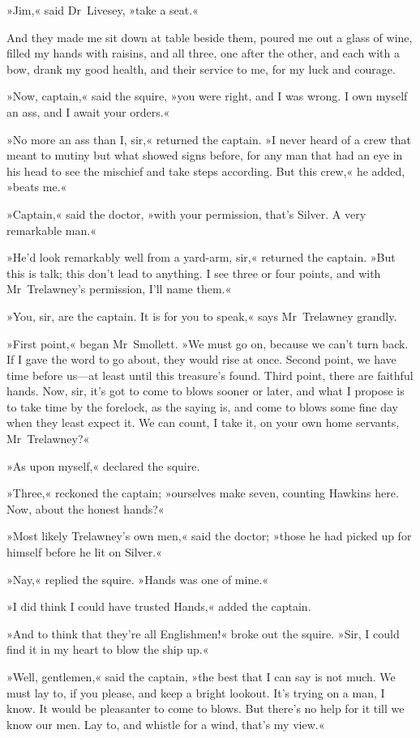 »Jim,« said Dr~Livesey, »take a seat.«

And they made me sit down at table beside them, poured me out a glass of wine, filled my hands with raisins, and all three, one after the other, and each with a bow, drank my good health, and their service to me, for my luck and courage.

»Now, captain,« said the squire, »you were right, and I was wrong. I own myself an ass, and I await your orders.«

»No more an ass than I, sir,« returned the captain. »I never heard of a crew that meant to mutiny but what showed signs before, for any man that had an eye in his head to see the mischief and take steps according. But this crew,« he added, »beats me.«

»Captain,« said the doctor, »with your permission, that's Silver. A very remarkable man.«

»He'd look remarkably well from a yard-arm, sir,« returned the captain. »But this is talk; this don't lead to anything. I see three or four points, and with Mr~Trelawney's permission, I'll name them.«

»You, sir, are the captain. It is for you to speak,« says Mr~Trelawney grandly.

»First point,« began Mr~Smollett. »We must go on, because we can't turn back. If I gave the word to go about, they would rise at once. Second point, we have time before us—at least until this treasure's found. Third point, there are faithful hands. Now, sir, it's got to come to blows sooner or later, and what I propose is to take time by the forelock, as the saying is, and come to blows some fine day when they least expect it. We can count, I take it, on your own home servants, Mr~Trelawney?«

»As upon myself,« declared the squire.

»Three,« reckoned the captain; »ourselves make seven, counting Hawkins here. Now, about the honest hands?«

»Most likely Trelawney's own men,« said the doctor; »those he had picked up for himself before he lit on Silver.«

»Nay,« replied the squire. »Hands was one of mine.«

»I did think I could have trusted Hands,« added the captain.

»And to think that they're all Englishmen!« broke out the squire. »Sir, I could find it in my heart to blow the ship up.«

»Well, gentlemen,« said the captain, »the best that I can say is not much. We must lay to, if you please, and keep a bright lookout. It's trying on a man, I know. It would be pleasanter to come to blows. But there's no help for it till we know our men. Lay to, and whistle for a wind, that's my view.«

